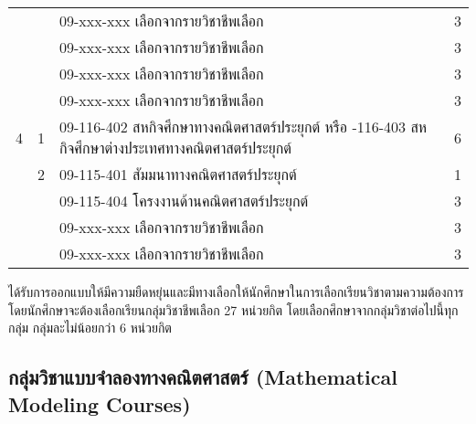 \begin{longtable}{|c|c|>{\raggedright}p{}|c|}
	&&09-xxx-xxx	เลือกจากรายวิชาชีพเลือก&3\\
	&&09-xxx-xxx	เลือกจากรายวิชาชีพเลือก&3\\
	&&09-xxx-xxx	เลือกจากรายวิชาชีพเลือก&3\\\hline
	&&09-xxx-xxx	เลือกจากรายวิชาชีพเลือก&3\\
	\hline
	4&1&09-116-402	สหกิจศึกษาทางคณิตศาสตร์ประยุกต์\newline
	หรือ
	\newline
	09-116-403	สหกิจศึกษาต่างประเทศทางคณิตศาสตร์ประยุกต์&6\\
	\cline{2-4}
	&2&09-115-401	สัมมนาทางคณิตศาสตร์ประยุกต์&1\\
	&&09-115-404	โครงงานด้านคณิตศาสตร์ประยุกต์&3\\
	&&09-xxx-xxx	เลือกจากรายวิชาชีพเลือก&3\\
	&&09-xxx-xxx	เลือกจากรายวิชาชีพเลือก&3\\
	\hline
\end{longtable}



\printprogram{} ได้รับการออกแบบให้มีความยืดหยุ่นและมีทางเลือกให้นักศึกษาในการเลือกเรียนวิชาตามความต้องการ โดยนักศึกษาจะต้องเลือกเรียนกลุ่มวิชาชีพเลือก 27 หน่วยกิต โดยเลือกศึกษาจากกลุ่มวิชาต่อไปนี้ทุกกลุ่ม กลุ่มละไม่น้อยกว่า 6 หน่วยกิต

\subsection*{กลุ่มวิชาแบบจำลองทางคณิตศาสตร์ (Mathematical Modeling Courses)}

